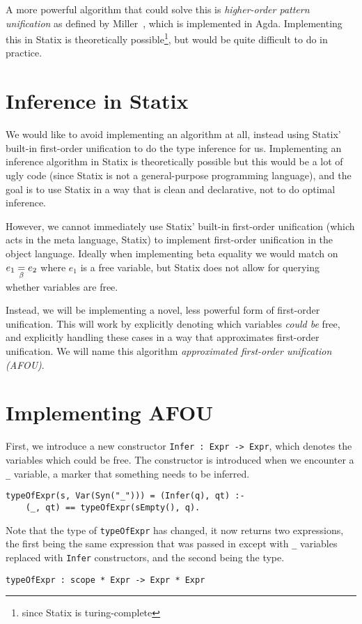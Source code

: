 A more powerful algorithm that could solve this is \emph{higher-order pattern unification} as defined by Miller~\cite{Miller89}, which is implemented in Agda. Implementing this in Statix is theoretically possible\footnote{since Statix is turing-complete}, but would be quite difficult to do in practice.

\section{Inference in Statix}
\label{statix-inference}

We would like to avoid implementing an algorithm at all, instead using Statix' built-in first-order unification to do the type inference for us. Implementing an inference algorithm in Statix is theoretically possible but this would be a lot of ugly code (since Statix is not a general-purpose programming language), and the goal is to use Statix in a way that is clean and declarative, not to do optimal inference.

However, we cannot immediately use Statix' built-in first-order unification (which acts in the meta language, Statix) to implement first-order unification in the object language. Ideally when implementing beta equality we would match on $e_1 \underset{\beta}{=} e_2$ where $e_1$ is a free variable, but Statix does not allow for querying whether variables are free. 

Instead, we will be implementing a novel, less powerful form of first-order unification. This will work by explicitly denoting which variables \emph{could be} free, and explicitly handling these cases in a way that approximates first-order unification. We will name this algorithm \emph{approximated first-order unification (AFOU)}.

\section{Implementing AFOU}
\label{implementing-inference}

First, we introduce a new constructor \verb|Infer : Expr -> Expr|, which denotes the variables which could be free. The constructor is introduced when we encounter a \verb|_| variable, a marker that something needs to be inferred.
\begin{lstlisting}
typeOfExpr(s, Var(Syn("_"))) = (Infer(q), qt) :-
	(_, qt) == typeOfExpr(sEmpty(), q).
\end{lstlisting}

Note that the type of \verb|typeOfExpr| has changed, it now returns two expressions, the first being the same expression that was passed in except with \verb|_| variables replaced with \verb|Infer| constructors, and the second being the type.
\begin{lstlisting}
typeOfExpr : scope * Expr -> Expr * Expr
\end{lstlisting}

